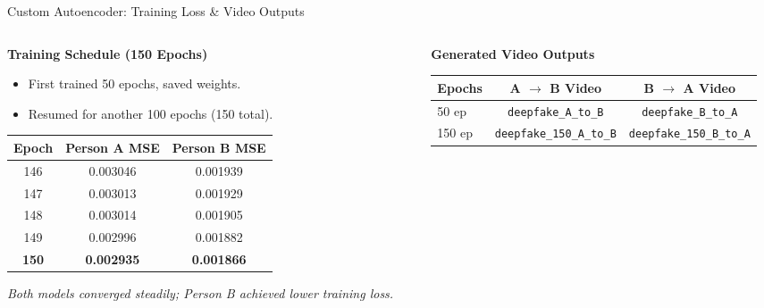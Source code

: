 \begin{frame}{Custom Autoencoder: Training Loss \& Video Outputs}
    \begin{columns}[c]
        \begin{column}{0.48\textwidth}
            \small
            \textbf{Training Schedule (150 Epochs)}
            \begin{itemize}
                \footnotesize
                \item First trained 50 epochs, saved weights.
                \item Resumed for another 100 epochs (150 total).
            \end{itemize}

            \vspace{0.1cm}
            \centering
            \footnotesize
            \begin{tabular}{ccc}
                \toprule
                \textbf{Epoch} & \textbf{Person A MSE} & \textbf{Person B MSE} \\
                \midrule
                146 & 0.003046 & 0.001939 \\
                147 & 0.003013 & 0.001929 \\
                148 & 0.003014 & 0.001905 \\
                149 & 0.002996 & 0.001882 \\
                \textbf{150} & \textbf{0.002935} & \textbf{0.001866} \\
                \bottomrule
            \end{tabular}

            \vspace{0.12cm}
            \raggedright
            \scriptsize \textit{Both models converged steadily; Person B achieved lower training loss.}
        \end{column}

        \begin{column}{0.48\textwidth}
            \centering
            \textbf{\footnotesize Generated Video Outputs}

            \vspace{0.1cm}
            \footnotesize
            \begin{tabular}{lcc}
                \toprule
                \textbf{Epochs} & \textbf{A $\to$ B Video} & \textbf{B $\to$ A Video} \\
                \midrule
                50 ep & \texttt{\tiny deepfake\_A\_to\_B} & \texttt{\tiny deepfake\_B\_to\_A} \\
                150 ep & \texttt{\tiny deepfake\_150\_A\_to\_B} & \texttt{\tiny deepfake\_150\_B\_to\_A} \\
                \bottomrule
            \end{tabular}


\end{column}
\end{columns}
\end{frame}
